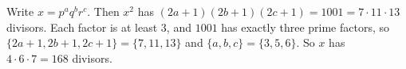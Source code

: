 Write $x=p^aq^br^c$. Then $x^2$ has $(2a+1)(2b+1)(2c+1)=1001=7\cdot11\cdot13$ divisors. Each factor is at least $3$, and $1001$ has exactly three prime factors, so $\{2a+1,2b+1,2c+1\}=\{7,11,13\}$ and $\{a,b,c\}=\{3,5,6\}$. So $x$ has $4\cdot6\cdot7=\boxed{168}$ divisors.
